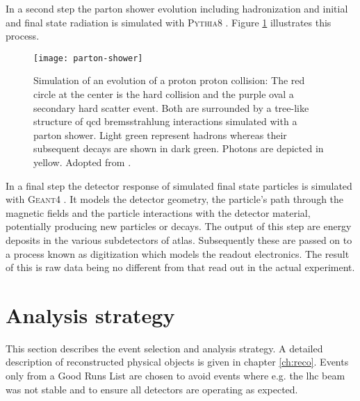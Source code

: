 In a second step the parton shower evolution including hadronization and initial and final state radiation is simulated with \textsc{Pythia8} \citep{Sjostrand:2014zea}. Figure \ref{fig:parton_shower} illustrates this process.
\begin{figure}[]
    \centering
    \texttt{[image: parton-shower]}
    \caption{Simulation of an evolution of a proton proton collision: The red circle at the center is the hard collision and the purple oval a secondary hard scatter event. Both are surrounded by a tree-like structure of \ac{qcd} bremsstrahlung interactions simulated with a parton shower. Light green represent hadrons whereas their subsequent decays are shown in dark green. Photons are depicted in yellow. Adopted from \citep{Hoche:2014rga}.
        \label{fig:parton_shower}}
\end{figure}

In a final step the detector response of simulated final state particles is simulated with \textsc{Geant}4 \citep{Agostinelli:2002hh}. It models the detector geometry, the particle's path through the magnetic fields and the particle interactions with the detector material, potentially producing new particles or decays. The output of this step are energy deposits in the various subdetectors of \ac{atlas}. Subsequently these are passed on to a process known as digitization which models the readout electronics. The result of this is raw data being no different from that read out in the actual experiment.

\section{Analysis strategy}
This section describes the event selection and analysis strategy. A detailed description of reconstructed physical objects is given in chapter \ref{ch:reco}. Events only from a Good Runs List are chosen to avoid events where e.g. the \ac{lhc} beam was not stable and to ensure all detectors  are operating as expected.

